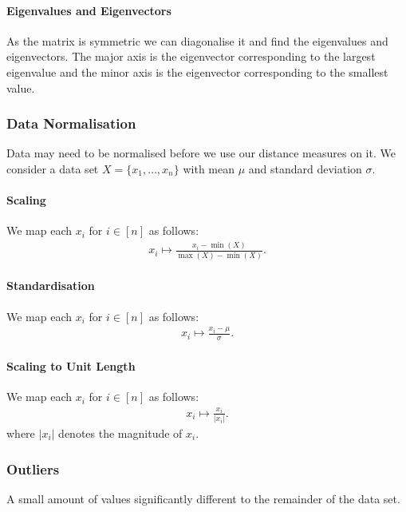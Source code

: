 \paragraph{Eigenvalues and Eigenvectors} As the matrix is symmetric
we can diagonalise it and find the eigenvalues and eigenvectors.
The major axis is the eigenvector corresponding to the largest
eigenvalue and the minor axis is the eigenvector corresponding
to the smallest value.

\subsubsection{Data Normalisation}

Data may need to be normalised before we use our distance measures
on it. We consider a data set $X = \{x_1, \ldots, x_n\}$
with mean $\mu$ and standard deviation $\sigma$.

\paragraph{Scaling} We map each $x_i$ for $i \in [n]$ as follows:
\begin{gather*}
    x_i \mapsto \frac{x_i - \min(X)}{\max(X) - \min(X)}.
\end{gather*}

\paragraph{Standardisation} We map each $x_i$ for $i \in [n]$ as follows:
\begin{gather*}
    x_i \mapsto \frac{x_i - \mu}{\sigma}.
\end{gather*}

\paragraph{Scaling to Unit Length} We map each $x_i$ for $i \in [n]$ as follows:
\begin{gather*}
    x_i \mapsto \frac{x_i}{|x_i|}.
\end{gather*} where $|x_i|$ denotes the magnitude of $x_i$.

\subsubsection{Outliers}

A small amount of values significantly different to the remainder
of the data set.